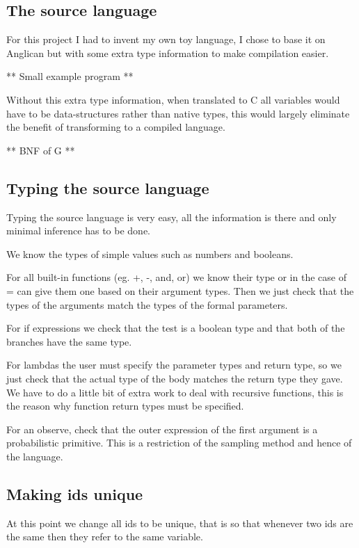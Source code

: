 \documentclass[a4paper]{article}
\begin{document}
\subsection{The source language}

For this project I had to invent my own toy language, I chose to base it on Anglican but with some extra type information to make compilation easier.

** Small example program **

Without this extra type information, when translated to C all variables would have to be data-structures rather than native types, this would largely eliminate the benefit of transforming to a compiled language.

** BNF of G **



\subsection{Typing the source language}

Typing the source language is very easy, all the information is there and only minimal inference has to be done.

We know the types of simple values such as numbers and booleans.

For all built-in functions (eg. +, -, and, or) we know their type or in the case of = can give them one based on their argument types. Then we just check that the types of the arguments match the types of the formal parameters.

For if expressions we check that the test is a boolean type and that both of the branches have the same type.

For lambdas the user must specify the parameter types and return type, so we just check that the actual type of the body matches the return type they gave. We have to do a little bit of extra work to deal with recursive functions, this is the reason why function return types must be specified.

For an observe, check that the outer expression of the first argument is a probabilistic primitive. This is a restriction of the sampling method and hence of the language.



\subsection{Making ids unique}

At this point we change all ids to be unique, that is so that whenever two ids are the same then they refer to the same variable.
\end{document}
